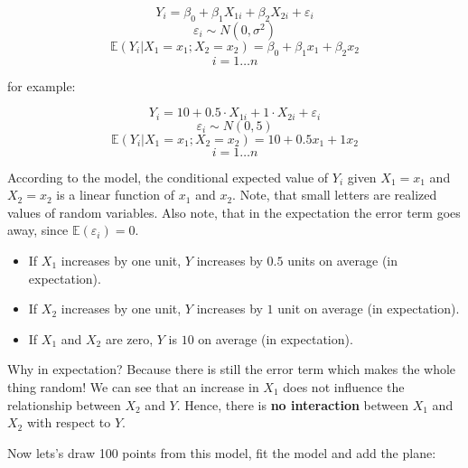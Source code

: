 \documentclass[
]{book}
\providecommand{\tightlist}{%
  \setlength{\itemsep}{0pt}\setlength{\parskip}{0pt}}
\begin{document}
\[ Y_i = \beta_0 + \beta_1 X_{1i} + \beta_2 X_{2i} + \varepsilon_i\]
\[ \varepsilon_i \sim N(0, \sigma^2)\]
\[ \mathbb{E}(Y_i|X_1 = x_1; X_2 = x_2) = \beta_0 + \beta_1 x_1 + \beta_2 x_2\]
\[ i = 1 \ldots n\]

for example:

\[ Y_i = 10 + 0.5 \cdot X_{1i} + 1 \cdot X_{2i} + \varepsilon_i\]
\[ \varepsilon_i \sim N(0, 5)\]
\[ \mathbb{E}(Y_i|X_1 = x_1; X_2 = x_2) = 10 + 0.5 x_1 + 1 x_2\]
\[ i = 1 \ldots n\]

According to the model, the conditional expected value of \(Y_i\) given \(X_1 = x_1\) and \(X_2 = x_2\)
is a linear function of \(x_1\) and \(x_2\). Note, that small letters are realized values
of random variables. Also note, that in the expectation the error term goes away, since
\(\mathbb{E}(\varepsilon_i) = 0\).

\begin{itemize}
\tightlist
\item
  If \(X_1\) increases by one unit, \(Y\) increases by \(0.5\) units on average (in expectation).
\item
  If \(X_2\) increases by one unit, \(Y\) increases by \(1\) unit on average (in expectation).
\item
  If \(X_1\) and \(X_2\) are zero, \(Y\) is \(10\) on average (in expectation).
\end{itemize}

Why in expectation? Because there is still the error term which makes the whole thing random!
We can see that an increase in \(X_1\) does not influence the relationship between \(X_2\) and \(Y\).
Hence, there is \textbf{no interaction} between \(X_1\) and \(X_2\) with respect to \(Y\).

Now lets's draw 100 points from this model, fit the model and add the plane:
\end{document}
